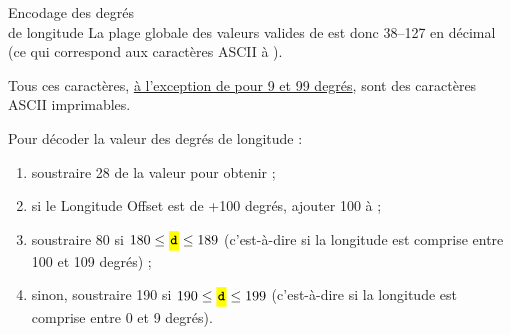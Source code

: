 \begin{aprssideblock}{Encodage des degrés\\de longitude}
La plage globale des valeurs valides de  est donc 38--127 en décimal
(ce qui correspond aux caractères ASCII \lit{\&} à ).

Tous ces caractères, \underline{à l'exception de  pour 9 et 99
degrés}, sont des caractères ASCII imprimables.

Pour décoder la valeur des degrés de longitude :

\begin{enumerate}\chTenItems
\item soustraire 28 de la valeur  pour obtenir  ;
\item si le Longitude Offset est de +100 degrés, ajouter 100 à  ;
\item soustraire 80 si $180 \le \lit{d} \le 189$ (c'est-à-dire si la longitude est
  comprise entre 100 et 109 degrés) ;
\item sinon, soustraire 190 si $190 \le \lit{d} \le 199$ (c'est-à-dire si la
  longitude est comprise entre 0 et 9 degrés).
\end{enumerate}
\end{aprssideblock}

